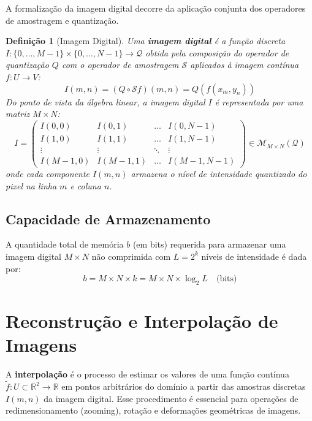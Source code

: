 \documentclass[a4paper,12pt]{report}
\newtheorem{Defini}{\bf Definição}
\begin{document}
A formalização da imagem digital decorre da aplicação conjunta dos operadores de amostragem e quantização.

\begin{Defini}[Imagem Digital]
Uma \textbf{imagem digital} é a função discreta $I: \{0, \dots, M-1\} \times \{0, \dots, N-1\} \to \mathcal{Q}$ obtida pela composição do operador de quantização $Q$ com o operador de amostragem $\mathcal{S}$ aplicados à imagem contínua $f: U \to V$:
\begin{equation}
I(m,n) = (Q \circ \mathcal{S} f)(m,n) = Q(f(x_m, y_n))
\end{equation}
Do ponto de vista da álgebra linear, a imagem digital $I$ é representada por uma matriz $M \times N$:
\begin{equation}
I = \begin{pmatrix}
I(0,0) & I(0,1) & \dots & I(0, N-1) \\
I(1,0) & I(1,1) & \dots & I(1, N-1) \\
\vdots & \vdots & \ddots & \vdots \\
I(M-1,0) & I(M-1,1) & \dots & I(M-1, N-1)
\end{pmatrix} \in \mathcal{M}_{M \times N}(\mathcal{Q})
\end{equation}
onde cada componente $I(m,n)$ armazena o nível de intensidade quantizado do pixel na linha $m$ e coluna $n$.
\end{Defini}

\subsection{Capacidade de Armazenamento}

A quantidade total de memória $b$ (em bits) requerida para armazenar uma imagem digital $M \times N$ não comprimida com $L = 2^k$ níveis de intensidade é dada por:
\begin{equation}
b = M \times N \times k = M \times N \times \log_2 L \quad \text{(bits)}
\end{equation}

\section{Reconstrução e Interpolação de Imagens}

A \textbf{interpolação} é o processo de estimar os valores de uma função contínua $\tilde{f}: U \subset \mathbb{R}^2 \to \mathbb{R}$ em pontos arbitrários do domínio a partir das amostras discretas $I(m,n)$ da imagem digital. Esse procedimento é essencial para operações de redimensionamento (zooming), rotação e deformações geométricas de imagens.
\end{document}

